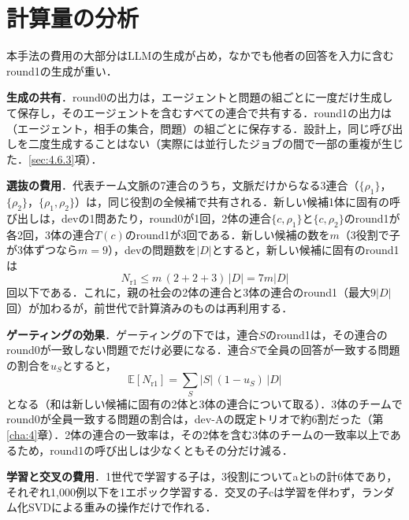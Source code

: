 \section{計算量の分析}
\label{sec:3.6}

本手法の費用の大部分はLLMの生成が占め，なかでも他者の回答を入力に含むround1の生成が重い．

\textbf{生成の共有}．round0の出力は，エージェントと問題の組ごとに一度だけ生成して保存し，そのエージェントを含むすべての連合で共有する．round1の出力は（エージェント，相手の集合，問題）の組ごとに保存する．設計上，同じ呼び出しを二度生成することはない（実際には並行したジョブの間で一部の重複が生じた．\ref{sec:4.6.3}項）．

\textbf{選抜の費用}．代表チーム文脈の7連合のうち，文脈だけからなる3連合（$\{\rho_1\}$，$\{\rho_2\}$，$\{\rho_1, \rho_2\}$）は，同じ役割の全候補で共有される．新しい候補1体に固有の呼び出しは，devの1問あたり，round0が1回，2体の連合$\{c, \rho_1\}$と$\{c, \rho_2\}$のround1が各2回，3体の連合$T(c)$のround1が3回である．新しい候補の数を$m$（3役割で子が3体ずつなら$m = 9$），devの問題数を$|D|$とすると，新しい候補に固有のround1は
\begin{equation}
N_{\mathrm{r1}} \le m \, (2 + 2 + 3)\, |D| = 7 m |D|
\label{eq:ncalls}
\end{equation}
回以下である．これに，親の社会の2体の連合と3体の連合のround1（最大$9|D|$回）が加わるが，前世代で計算済みのものは再利用する．

\textbf{ゲーティングの効果}．ゲーティングの下では，連合$S$のround1は，その連合のround0が一致しない問題でだけ必要になる．連合$S$で全員の回答が一致する問題の割合を$u_S$とすると，
\begin{equation}
\mathbb{E}[N_{\mathrm{r1}}] = \sum_{S} |S| \, (1 - u_S) \, |D|
\label{eq:ncalls_gated}
\end{equation}
となる（和は新しい候補に固有の2体と3体の連合について取る）．3体のチームでround0が全員一致する問題の割合は，dev-Aの既定トリオで約6割だった（第\ref{cha:4}章）．2体の連合の一致率は，その2体を含む3体のチームの一致率以上であるため，round1の呼び出しは少なくともその分だけ減る．

\textbf{学習と交叉の費用}．1世代で学習する子は，3役割についてaとbの計6体であり，それぞれ1,000例以下を1エポック学習する．交叉の子cは学習を伴わず，ランダム化SVDによる重みの操作だけで作れる．

